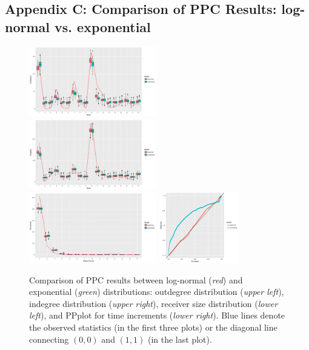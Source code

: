 \documentclass[ba]{imsart}
\numberwithin{equation}{section}
\theoremstyle{plain}
\begin{document}
	\subsection*{Appendix C: Comparison of PPC Results: log-normal vs. exponential}\label{appendix: PPCexp}
		\begin{figure}[H]
			\centering
			\includegraphics[width=0.495\textwidth]{img/outdegree_two-1.png}	
			\includegraphics[width=0.495\textwidth]{img/indegree_two-1.png}	
			\includegraphics[width=0.495\textwidth]{img/recipientsize_two-1.png}	
			\includegraphics[width=0.31\textwidth]{img/timepp_two-1.png}
			\caption {Comparison of PPC results between log-normal (\textit{red}) and exponential (\textit{green}) distributions: outdegree distribution (\textit{upper left}), indegree distribution (\textit{upper right}), receiver size distribution (\textit{lower left}), and PPplot for time increments (\textit{lower right}). Blue lines denote the observed statistics (in the first three plots) or the diagonal line connecting $(0, 0)$ and $(1, 1)$ (in the last plot).}
			\label{figure:PPCtwo}                                          
		\end{figure}                                                                                                                                                                     
		\newpage
\end{document}
